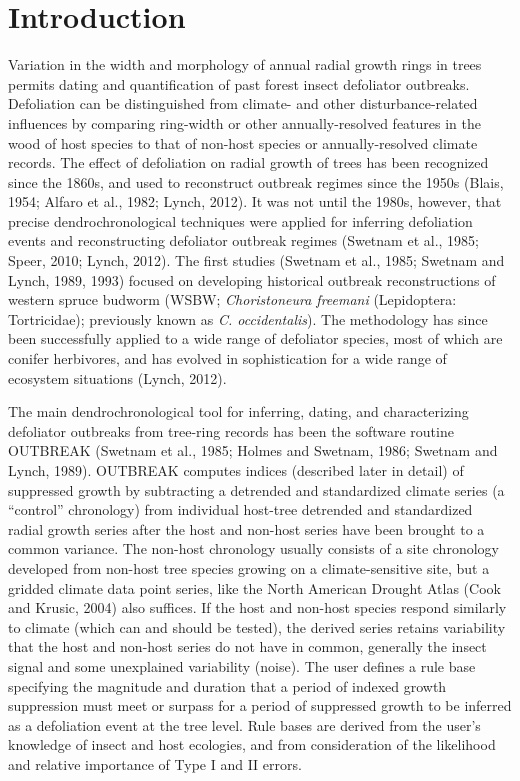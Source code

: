 \documentclass[review]{elsarticle} %
\begin{document}
\hypertarget{introduction}{%
\section{Introduction}\label{introduction}}

Variation in the width and morphology of annual radial growth rings in trees permits dating and quantification of past forest insect defoliator outbreaks. Defoliation can be distinguished from climate- and other disturbance-related influences by comparing ring-width or other annually-resolved features in the wood of host species to that of non-host species or annually-resolved climate records. The effect of defoliation on radial growth of trees has been recognized since the 1860s, and used to reconstruct outbreak regimes since the 1950s (Blais, 1954; Alfaro et al., 1982; Lynch, 2012). It was not until the 1980s, however, that precise dendrochronological techniques were applied for inferring defoliation events and reconstructing defoliator outbreak regimes (Swetnam et al., 1985; Speer, 2010; Lynch, 2012). The first studies (Swetnam et al., 1985; Swetnam and Lynch, 1989, 1993) focused on developing historical outbreak reconstructions of western spruce budworm (WSBW; \emph{Choristoneura freemani} (Lepidoptera: Tortricidae); previously known as \emph{C. occidentalis}). The methodology has since been successfully applied to a wide range of defoliator species, most of which are conifer herbivores, and has evolved in sophistication for a wide range of ecosystem situations (Lynch, 2012).

The main dendrochronological tool for inferring, dating, and characterizing defoliator outbreaks from tree-ring records has been the software routine OUTBREAK (Swetnam et al., 1985; Holmes and Swetnam, 1986; Swetnam and Lynch, 1989). OUTBREAK computes indices (described later in detail) of suppressed growth by subtracting a detrended and standardized climate series (a ``control'' chronology) from individual host-tree detrended and standardized radial growth series after the host and non-host series have been brought to a common variance. The non-host chronology usually consists of a site chronology developed from non-host tree species growing on a climate-sensitive site, but a gridded climate data point series, like the North American Drought Atlas (Cook and Krusic, 2004) also suffices. If the host and non-host species respond similarly to climate (which can and should be tested), the derived series retains variability that the host and non-host series do not have in common, generally the insect signal and some unexplained variability (noise). The user defines a rule base specifying the magnitude and duration that a period of indexed growth suppression must meet or surpass for a period of suppressed growth to be inferred as a defoliation event at the tree level. Rule bases are derived from the user's knowledge of insect and host ecologies, and from consideration of the likelihood and relative importance of Type I and II errors.
\end{document}
